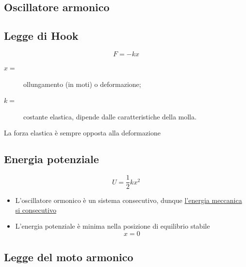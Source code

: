\documentclass{book}
\begin{document}
\subsection{Oscillatore armonico}
\label{sec:oscarm}


\subsection{Legge di Hook}
\label{sec:leggedihook}

\begin{equation}
  \label{eq:leggedihook}
  F=-kx
\end{equation}
\begin{description}
\item[$x=$] ollungamento (in moti) o deformazione;
\item[$k=$] costante elastica, dipende dalle caratteristiche della molla.
\end{description}
La forza elastica è sempre opposta alla deformazione

\subsection{Energia potenziale}
\label{sec:enpotenz}
\begin{equation}
  \label{eq:enpotenz}
  U=\frac{1}{2}kx^2
\end{equation}
\begin{itemize}
\item L'oscillatore ormonico è un sistema consecutivo, dunque \underline{l'energia meccanica si consecutivo}
\item L'energia potenziale è minima nella posizione di equilibrio stabile
  \begin{equation}
    \label{eq:enpotenz2}
    x=0
  \end{equation}
\end{itemize}

\subsection{Legge del moto armonico}
\label{sec:leggdelmotarmo}
\end{document}
